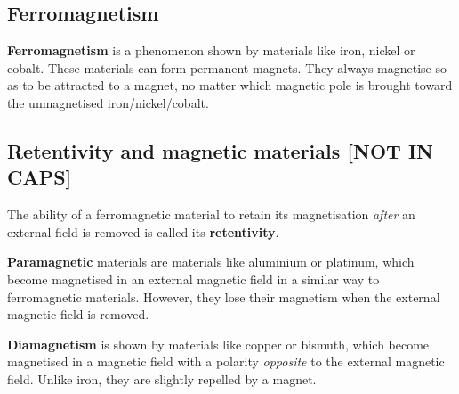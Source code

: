             \subsection*{Ferromagnetism}
            \nopagebreak
        \label{m37830*id129174}\textbf{Ferromagnetism} is a
phenomenon shown by materials like iron, nickel or cobalt.
These materials can form permanent magnets. They always
magnetise so as to be attracted to a magnet, no matter which
magnetic pole is brought toward the unmagnetised iron/nickel/cobalt.\par 
\subsection*{Retentivity and magnetic materials [NOT IN CAPS]}
        \label{m37830*id129186}The ability of a ferromagnetic material to retain its
magnetisation \textsl{after} an external field is removed is called its
\textbf{retentivity}.\par 
        \label{m37830*id129203}\textbf{Paramagnetic} materials are materials like
aluminium or platinum, which become magnetised in an external
magnetic field in a similar way to ferromagnetic materials. However, they
lose their magnetism when the external magnetic field is removed.\par 
        \label{m37830*id129214}\textbf{Diamagnetism} is shown by materials like copper or bismuth,
which become magnetised in a magnetic field with a polarity
\textsl{opposite} to the external magnetic field. Unlike iron, they are
slightly repelled by a magnet.
 \par 
